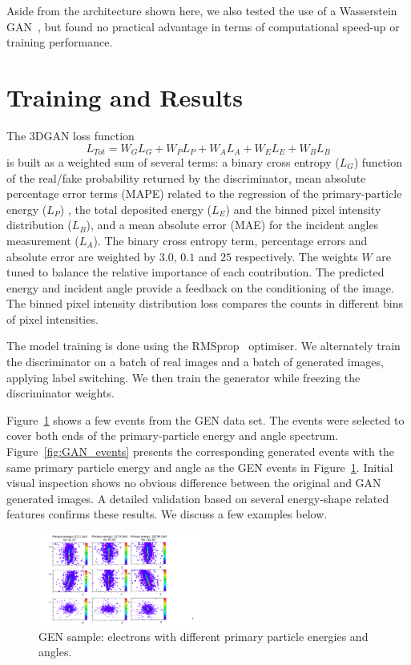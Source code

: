 Aside from the architecture shown here, we also tested the use of a Wasserstein GAN~\cite{wgan}, but found no practical advantage in terms of computational speed-up or training performance.

\section{Training and Results}
The 3DGAN loss function
\begin{equation}
    L_{Tot} = W_{G}L_{G} + W_{P}L_{P} + W_{A}L_{A} + W_{E}L_{E} + W_{B}L_{B} 
\label{eq:loss}
\end{equation}
is built as a weighted sum of several terms: a binary cross entropy ($L_{G}$) function of the real/fake probability returned by the discriminator, mean absolute percentage error terms (MAPE) related to the regression of the primary-particle energy ($L_{P}$) , the total deposited energy ($L_{E}$) and the binned pixel intensity distribution ($L_{B}$), and a mean absolute error (MAE) for the incident angles measurement ($L_{A}$). The binary cross entropy term, percentage errors and absolute error are weighted by $3.0$, $0.1$ and $25$ respectively. The weights $W$ are tuned to balance the relative importance of each contribution. The predicted energy and incident angle provide a feedback on the conditioning of the image. The binned pixel intensity distribution loss compares the counts in different bins of pixel intensities. 

The model training is done using the RMSprop~\cite{rmsProp} optimiser. We alternately train the discriminator on a batch of real images and a batch of generated images, applying label switching. We then train the generator while freezing the discriminator weights.

Figure~\ref{fig:GEANT4_events} shows a few events from the GEN data set. The events were selected to cover both ends of the primary-particle energy and angle spectrum. Figure~\ref{fig:GAN_events} presents the corresponding generated events with the same primary particle energy and angle as the GEN events in Figure~\ref{fig:GEANT4_events}. Initial visual inspection shows no obvious difference between the original and GAN generated images. A detailed validation based on several energy-shape related features confirms these results. We discuss a few examples below.

\begin{figure}[htbp]
    \includegraphics[width=0.48\textwidth]{Images/Calo/GAN_g4_events.pdf}
    \caption{GEN sample: electrons with different primary particle energies and angles.}
    \label{fig:GEANT4_events}
\end{figure}

